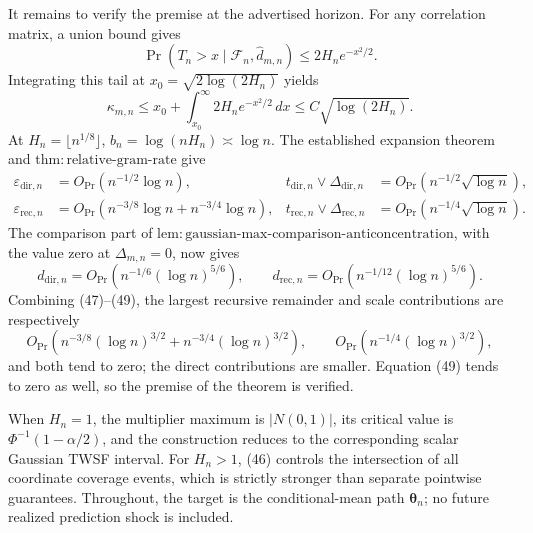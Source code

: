 It remains to verify the premise at the advertised horizon.  For any correlation matrix, a union bound gives
\[
 \Pr(T_n>x\mid\mathcal F_n,\widehat d_{m,n})\le2H_n e^{-x^2/2}.
\]
Integrating this tail at \(x_0=\sqrt{2\log(2H_n)}\) yields
\[
 \kappa_{m,n}\le x_0+\int_{x_0}^{\infty}2H_ne^{-x^2/2}\,dx
 \le C\sqrt{\log(2H_n)}.
 \tag{47}
\]
At \(H_n=\lfloor n^{1/8}\rfloor\), \(b_n=\log(nH_n)\asymp\log n\).  The established expansion theorem and \(\mathrm{thm{:}relative\mbox{-}gram\mbox{-}rate}\) give
\[
\begin{aligned}
 \varepsilon_{\mathrm{dir},n}
   &=O_{\Pr}(n^{-1/2}\log n),
 &t_{\mathrm{dir},n}\vee\Delta_{\mathrm{dir},n}
   &=O_{\Pr}(n^{-1/2}\sqrt{\log n}),\\
 \varepsilon_{\mathrm{rec},n}
   &=O_{\Pr}(n^{-3/8}\log n+n^{-3/4}\log n),
 &t_{\mathrm{rec},n}\vee\Delta_{\mathrm{rec},n}
   &=O_{\Pr}(n^{-1/4}\sqrt{\log n}).
\end{aligned}
 \tag{48}
\]
The comparison part of
\(\mathrm{lem{:}gaussian\mbox{-}max\mbox{-}comparison\mbox{-}anticoncentration}\), with the value zero at \(\Delta_{m,n}=0\), now gives
\[
 d_{\mathrm{dir},n}
 =O_{\Pr}\!\left(n^{-1/6}(\log n)^{5/6}\right),\qquad
 d_{\mathrm{rec},n}
 =O_{\Pr}\!\left(n^{-1/12}(\log n)^{5/6}\right).
 \tag{49}
\]
Combining (47)--(49), the largest recursive remainder and scale contributions are respectively
\[
 O_{\Pr}\!\left(n^{-3/8}(\log n)^{3/2}
                  +n^{-3/4}(\log n)^{3/2}\right),\qquad
 O_{\Pr}\!\left(n^{-1/4}(\log n)^{3/2}\right),
\]
and both tend to zero; the direct contributions are smaller.  Equation (49) tends to zero as well, so the premise of the theorem is verified.

When \(H_n=1\), the multiplier maximum is \(|N(0,1)|\), its critical value is \(\Phi^{-1}(1-\alpha/2)\), and the construction reduces to the corresponding scalar Gaussian TWSF interval.  For \(H_n>1\), (46) controls the intersection of all coordinate coverage events, which is strictly stronger than separate pointwise guarantees.  Throughout, the target is the conditional-mean path \(\boldsymbol\theta_n\); no future realized prediction shock is included.
